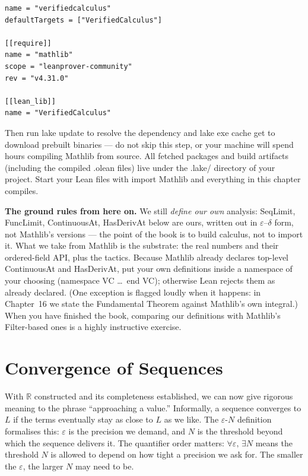 \documentclass[12pt, openany]{book}
\theoremstyle{plain}
\theoremstyle{definition}
\theoremstyle{remark}
\newcommand{\R}{\mathbb{R}}
\newcommand{\li}[1]{{\ttfamily\small\color{tealaccent}#1}}
\begin{document}
\begin{leanbox}[title={lakefile.toml}]
\begin{lstlisting}
name = "verifiedcalculus"
defaultTargets = ["VerifiedCalculus"]

[[require]]
name = "mathlib"
scope = "leanprover-community"
rev = "v4.31.0"

[[lean_lib]]
name = "VerifiedCalculus"
\end{lstlisting}
\end{leanbox}
\color{black}

Then run \li{lake update} to resolve the dependency and \li{lake exe cache get} to download prebuilt binaries --- do not skip this step, or your machine will spend hours compiling Mathlib from source.  All fetched packages and build artifacts (including the compiled \li{.olean} files) live under the \li{.lake/} directory of your project.  Start your Lean files with \li{import Mathlib} and everything in this chapter compiles.

\textbf{The ground rules from here on.}  We still \emph{define our own} analysis: \li{SeqLimit}, \li{FuncLimit}, \li{ContinuousAt}, \li{HasDerivAt} below are ours, written out in $\varepsilon$--$\delta$ form, not Mathlib's versions --- the point of the book is to build calculus, not to import it.  What we take from Mathlib is the substrate: the real numbers and their ordered-field API, plus the tactics.  Because Mathlib already declares top-level \li{ContinuousAt} and \li{HasDerivAt}, put your own definitions inside a namespace of your choosing (\li{namespace VC} \ldots\ \li{end VC}); otherwise Lean rejects them as already declared.  (One exception is flagged loudly when it happens: in Chapter~16 we state the Fundamental Theorem against Mathlib's own integral.)  When you have finished the book, comparing our definitions with Mathlib's \li{Filter}-based ones is a highly instructive exercise.

\section{Convergence of Sequences}

With $\R$ constructed and its completeness established, we can now give rigorous meaning to the phrase ``approaching a value.''  Informally, a sequence converges to $L$ if the terms eventually stay as close to $L$ as we like.  The $\varepsilon$-$N$ definition formalises this: $\varepsilon$ is the precision we demand, and $N$ is the threshold beyond which the sequence delivers it.  The quantifier order matters: $\forall \varepsilon,\, \exists N$ means the threshold $N$ is allowed to depend on how tight a precision we ask for.  The smaller the $\varepsilon$, the larger $N$ may need to be.
\end{document}
